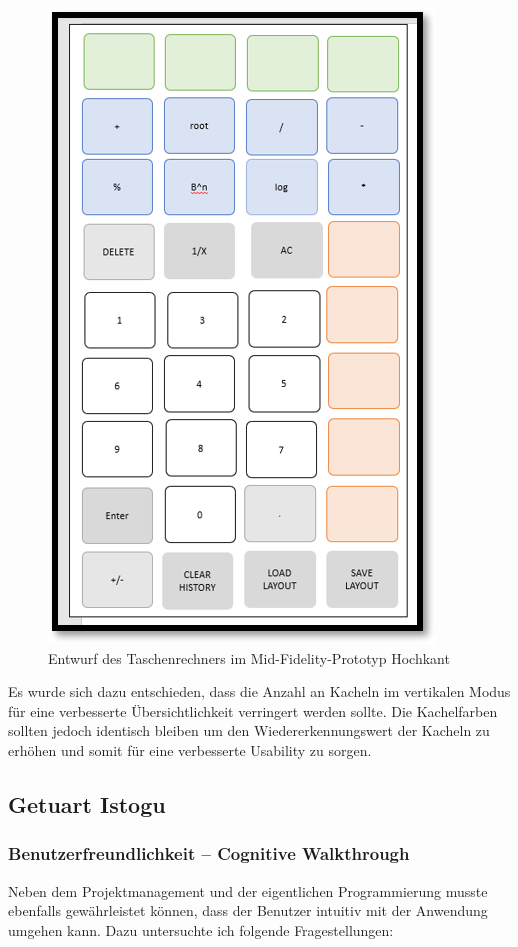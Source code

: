 \begin{figure}[!h]
	\includegraphics[scale=1]{img/erster-entwurf-mid-fidelty-prototyp-hoch}
	\caption[Entwurf des Taschenrechners im Mid-Fidelity-Prototyp Hochkant]{Entwurf des Taschenrechners im Mid-Fidelity-Prototyp Hochkant\footnotemark}
\end{figure}

Es wurde sich dazu entschieden, dass die Anzahl an Kacheln im vertikalen Modus für eine verbesserte Übersichtlichkeit verringert werden sollte. Die Kachelfarben sollten jedoch identisch bleiben um den Wiedererkennungswert der Kacheln zu erhöhen und somit für eine verbesserte Usability zu sorgen.

\FloatBarrier

\subsection{Getuart Istogu}

\subsubsection{Benutzerfreundlichkeit – Cognitive Walkthrough}
Neben dem Projektmanagement und der eigentlichen Programmierung musste ebenfalls gewährleistet können, dass der Benutzer intuitiv mit der Anwendung umgehen kann. Dazu untersuchte ich folgende Fragestellungen:

